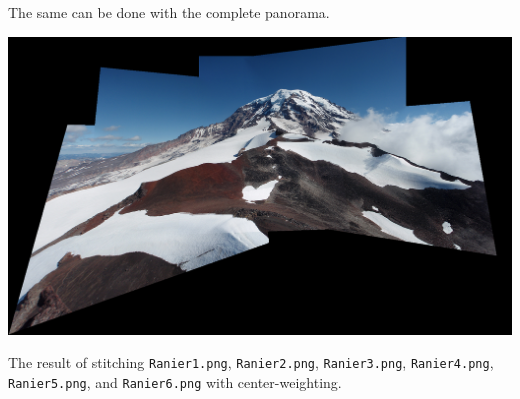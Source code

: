 \documentclass[letterpaper]{article}
\begin{document}
The same can be done with the complete panorama.

\begin{center}
  \includegraphics[width=\textwidth]{all_stitched_center_weighted.png}
  
  The result of stitching \texttt{Ranier1.png}, \texttt{Ranier2.png},
  \texttt{Ranier3.png}, \texttt{Ranier4.png}, \texttt{Ranier5.png}, and
  \texttt{Ranier6.png} with center-weighting.
\end{center}
\end{document}
